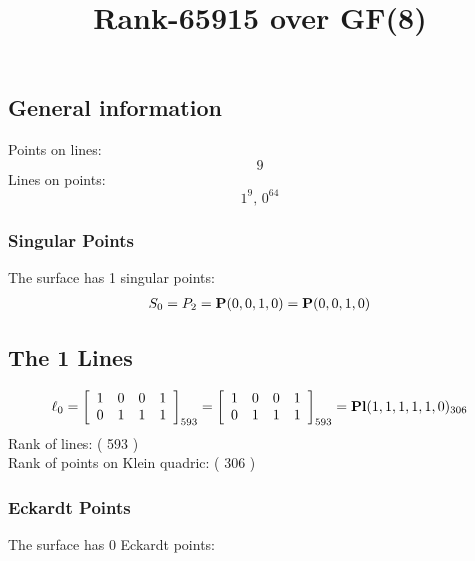 \documentclass{article}
\newcommand\setTBstruts{\def\T{\rule{0pt}{2.6ex}}%
\def\B{\rule[-1.2ex]{0pt}{0pt}}}
\newcommand{\bP}{{\bf P}}
\begin{document}
 
\setTBstruts



{\allowdisplaybreaks%






\title{Rank-65915 over GF(8)}
\author{}%
\maketitle%
%
{}



\subsection*{General information}
Points on lines:
$$
9$$
Lines on points:
$$
1^9,\,0^{64}$$
\subsubsection*{Singular Points}
The surface has 1 singular points:\\
\begin{align*}
S_{0} &= P_{2}=\bP(0, 0, 1, 0) = \bP(0, 0, 1, 0)\\
\end{align*}
\subsection*{The 1 Lines}
$$
\ell_{0} = 
\left[
\begin{array}{*{4}{r}}
1 & 0 & 0 & 1\\
0 & 1 & 1 & 1\\
\end{array}
\right]
_{593}
=
\left[
\begin{array}{*{4}c}
1  & 0  & 0  & 1\\
0  & 1  & 1  & 1\\
\end{array}
\right]_{593}
={\rm\bf Pl}(1,1,1,1,1,0 )_{306}$$
Rank of lines: ( 593 )\\
Rank of points on Klein quadric: ( 306 )\\
\subsubsection*{Eckardt Points}
The surface has 0 Eckardt points:\\
}
\end{document}
